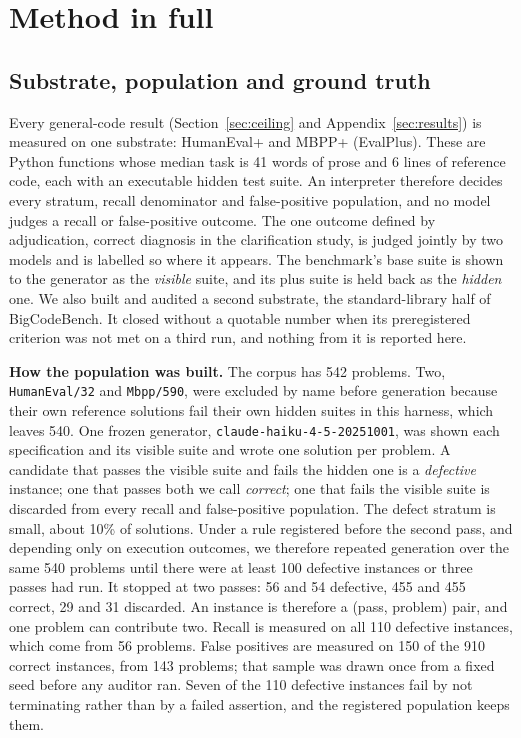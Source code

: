 \section{Method in full}
\label{sec:method}

\subsection{Substrate, population and ground truth}

Every general-code result (Section~\ref{sec:ceiling} and Appendix~\ref{sec:results}) is measured on one substrate: HumanEval+ and MBPP+ (EvalPlus).
These are Python functions whose median task is 41 words of prose and 6 lines of reference code, each with
an executable hidden test suite. An interpreter therefore decides every stratum, recall denominator
and false-positive population, and no model judges a recall or false-positive outcome.
The one outcome defined by adjudication, correct diagnosis in the clarification study, is judged
jointly by two models and is labelled so where it appears. The benchmark's base suite is shown to
the generator as the \emph{visible} suite, and its plus suite is held back as the \emph{hidden}
one. We also built and audited a second substrate, the standard-library half of BigCodeBench. It
closed without a quotable number when its preregistered criterion was not met on a third run, and
nothing from it is reported here.

\textbf{How the population was built.} The corpus has 542 problems. Two, \texttt{HumanEval/32}
and \texttt{Mbpp/590}, were excluded by name before generation because their own reference
solutions fail their own hidden suites in this harness, which leaves 540. One frozen generator,
\texttt{claude-haiku-4-5-20251001}, was shown each specification and its visible suite and wrote
one solution per problem. A candidate that passes the visible suite and fails the hidden one is a
\emph{defective} instance; one that passes both we call \emph{correct}; one that fails the visible
suite is discarded from every recall and false-positive population. The defect stratum is small,
about 10\% of solutions. Under a rule registered before the second pass, and depending only on
execution outcomes, we therefore repeated generation over the same 540 problems until there were at
least 100 defective instances or three passes had run. It stopped at two passes: 56 and 54 defective,
455 and 455 correct, 29 and 31 discarded. An instance is therefore a (pass, problem) pair, and one
problem can contribute two. Recall is measured on all 110 defective instances, which come from
56 problems. False positives are measured on 150 of the 910 correct instances, from 143 problems;
that sample was drawn once from a fixed seed before any auditor ran. Seven of the 110 defective instances
fail by not terminating rather than by a failed assertion, and the registered population keeps
them.

